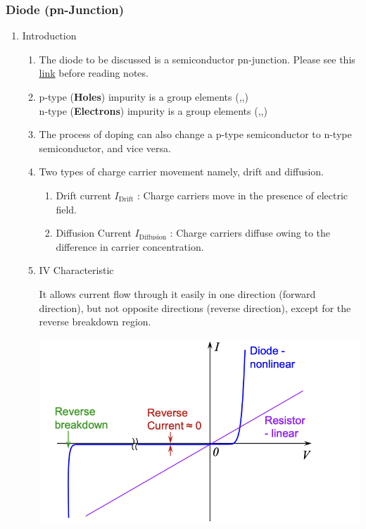 \subsubsection{Diode (pn-Junction)}
\begin{enumerate}
    \item Introduction
    \begin{enumerate}
        \item The diode to be discussed is a semiconductor pn-junction. Please see this \href{https://www.youtube.com/watch?v=Fwj_d3uO5g8}{link} before reading notes.
        \item p-type (\textbf{Holes}) impurity is a group  elements (,,)\\
        n-type (\textbf{Electrons}) impurity is a group  elements (,,)
        \item The process of doping can also change a p-type semiconductor to n-type semiconductor, and vice versa.
        \item Two types of charge carrier movement namely, drift and diffusion.
        \begin{enumerate}
            \item Drift current $I_{\text{Drift}}$ : Charge carriers move in the presence of electric field.
            \item Diffusion Current $I_{\text{Diffusion}}$ : Charge carriers diffuse owing to the difference in carrier concentration.
        \end{enumerate}
        \item IV Characteristic\\
            \begin{minipage}{0.4\textwidth}
            It allows current flow through it easily in one direction (forward direction), but not opposite directions (reverse direction), except for the reverse breakdown region.
            \end{minipage}
            \begin{minipage}{0.6\textwidth}
                \includegraphics[width=1\linewidth]{image/pnchar.png}

\end{minipage}
\end{enumerate}
\end{enumerate}
